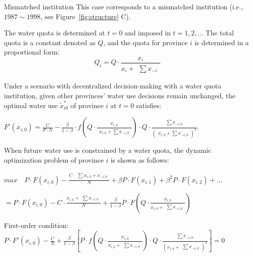 \documentclass{nsr}
\begin{document}
\begin{case} Mismatched institution
    This case corresponds to a mismatched institution (i.e., $1987\sim1998$, see Figure~\ref{fig:structure} C).

    The water quota is determined at $t=0$ and imposed in $t=1,2,\ldots$ The total quota is a constant denoted as $Q$, and the quota for province $i$ is determined in a proportional form:
    $$Q_i=Q \cdot \frac{x_i}{x_i + \begin{matrix} \sum x_{-i} \end{matrix}}$$

    Under a scenario with decentralized decision-making with a water quota institution, given other provinces’ water use decisions remain unchanged, the optimal water use $\widetilde x_{i0}^*$ of province $i$ at $t=0$ satisfies:

    $F'(x_{i,0})=\frac{C}{P \cdot N} - \frac{\beta}{1-\beta} \cdot f(Q \cdot \frac{x_{i,0}}{\begin{matrix} x_{i,0} + \sum x_{-i,0} \end{matrix}}) \cdot Q \cdot \frac{\begin{matrix} \sum x_{-i,0} \end{matrix}}{(\begin{matrix} x_{i,0} + \sum x_{-i,0} \end{matrix})^2}$.

    When future water use is constrained by a water quota, the dynamic optimization problem of province $i$ is shown as follows:

    $max  \quad P \cdot F(x_{i,0})-\frac{C \cdot \begin{matrix} \sum x_{i,0} + x_{-i,0} \end{matrix}}{N}+\beta P \cdot F(x_{i,1})+\beta^2 P \cdot F(x_{i,2})+...$

    $=P \cdot F(x_{i,0})-C \cdot \frac{x_{i,0} + \begin{matrix} \sum x_{-i,0} \end{matrix}}{N}+\frac{\beta}{1-\beta} P \cdot F(Q \cdot \frac{x_{i,0}}{x_{i,0} + \begin{matrix} \sum x_{-i,0} \end{matrix}})$

    First-order condition: $P \cdot F'(x_{i,0})-\frac{C}{N}+\frac{\beta}{1-\beta}[P \cdot f(Q \cdot \frac{x_{i,0}}{x_{i,0} + \begin{matrix} \sum x_{-i,0} \end{matrix}}) \cdot Q \cdot \frac{\begin{matrix} \sum x_{-i,0} \end{matrix}}{(x_{i,0}+\begin{matrix} \sum  x_{-i,0} \end{matrix})^2}]=0$


\end{case}
\end{document}

